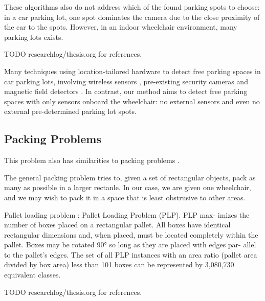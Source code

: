 These algorithms also do not address which of the found parking spots to choose:
in a car parking lot, one spot dominates the camera due to the close proximity
of the car to the spots. However, in an indoor wheelchair environment, many
parking lots exists.

TODO researchlog/thesis.org for references.

Many techniques using location-tailored hardware to detect free parking spaces
in car parking lots, involving wireless sensors \cite{panja2011wirelessly},
pre-existing security cameras \cite{true2007vacant} and magnetic field detectors
\cite{boda2007design}. In contrast, our method aims to detect free parking
spaces with only sensors onboard the wheelchair: no external sensors and even no
external pre-determined parking lot spots.


\subsection{Packing Problems}
This problem also has similarities to packing problems \cite{dyckhoff1990typology}.

The general packing
problem tries to, given a set of rectangular objects, pack as many as possible
in a larger rectanle. In our case, we are given one wheelchair, and we may wish
to pack it in a space that is least obstrusive to other areas.

Pallet loading problem \cite{martins2008solving}:
Pallet Loading Problem (PLP). PLP max- imizes the number of boxes placed on a
rectangular pallet. All boxes have identical rectangular dimensions and, when
placed, must be located completely within the pallet. Boxes may be rotated 90°
so long as they are placed with edges par- allel to the pallet’s edges. The set
of all PLP instances with an area ratio (pallet area divided by box area) less
than 101 boxes can be represented by 3,080,730 equivalent classes.


TODO researchlog/thesis.org for references.


